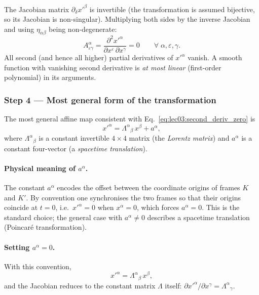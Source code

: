 The Jacobian matrix $\partial_\delta x'^\beta$ is invertible (the
transformation is assumed bijective, so its Jacobian is non-singular).
Multiplying both sides by the inverse Jacobian and using
$\eta_{\alpha\beta}$ being non-degenerate:
\begin{equation}
  A^\alpha_{\varepsilon\gamma} =
  \frac{\partial^2 x'^\alpha}{\partial x^\varepsilon\,\partial x^\gamma}
  = 0
  \qquad\forall\;\alpha,\varepsilon,\gamma.
  \label{eq:lec03:second_deriv_zero}
\end{equation}
All second (and hence all higher) partial derivatives of $x'^\alpha$
vanish.  A smooth function with vanishing second derivative is
\emph{at most linear} (first-order polynomial) in its arguments.

\subsubsection*{Step 4 — Most general form of the transformation}

The most general affine map consistent with
Eq.~\eqref{eq:lec03:second_deriv_zero} is
\begin{equation}
  x'^\alpha = \Lambda^\alpha{}_\beta\,x^\beta + a^\alpha,
  \label{eq:lec03:affine}
\end{equation}
where $\Lambda^\alpha{}_\beta$ is a constant invertible $4\times 4$
matrix (the \emph{Lorentz matrix}) and $a^\alpha$ is a constant
four-vector (a \emph{spacetime translation}).

\paragraph{Physical meaning of $a^\alpha$.}
The constant $a^\alpha$ encodes the offset between the coordinate
origins of frames $K$ and $K'$.  By convention one synchronises the
two frames so that their origins coincide at $t=0$, i.e.\
$x'^\alpha=0$ when $x^\alpha=0$, which forces $a^\alpha = 0$.  This
is the standard choice; the general case with $a^\alpha\neq 0$
describes a spacetime translation (Poincaré transformation).

\paragraph{Setting $a^\alpha = 0$.}
With this convention,
\begin{equation}
  x'^\alpha = \Lambda^\alpha{}_\beta\,x^\beta,
  \label{eq:lec03:lorentz_map}
\end{equation}
and the Jacobian reduces to the constant matrix $\Lambda$ itself:
$\partial x'^\alpha/\partial x^\gamma = \Lambda^\alpha{}_\gamma$.

